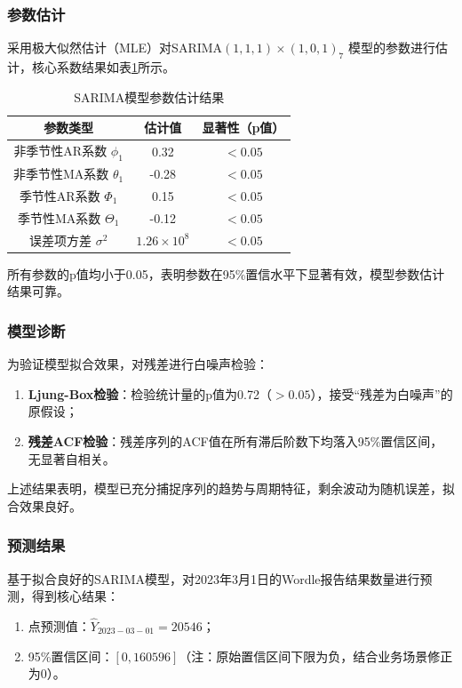 \documentclass[12pt]{article}  %
\begin{document}
\subsubsection{参数估计}
采用极大似然估计（MLE）对SARIMA$(1,1,1)\times(1,0,1)_7$ 模型的参数进行估计，核心系数结果如表\ref{tab:sarima_params}所示。
\begin{table}[htbp]
    \centering
    \caption{SARIMA模型参数估计结果}
    \label{tab:sarima_params}
    \begin{tabular}{@{}ccc@{}}
        \toprule
        参数类型 & 估计值 & 显著性（p值） \\
        \midrule
        非季节性AR系数 $\phi_1$ & 0.32 & $<0.05$ \\
        非季节性MA系数 $\theta_1$ & -0.28 & $<0.05$ \\
        季节性AR系数 $\Phi_1$ & 0.15 & $<0.05$ \\
        季节性MA系数 $\Theta_1$ & -0.12 & $<0.05$ \\
        误差项方差 $\sigma^2$ & $1.26\times10^8$ & $<0.05$ \\
        \bottomrule
    \end{tabular}
\end{table}
所有参数的p值均小于0.05，表明参数在95\%置信水平下显著有效，模型参数估计结果可靠。

\subsubsection{模型诊断}
为验证模型拟合效果，对残差进行白噪声检验：
\begin{enumerate}
    \item \textbf{Ljung-Box检验}：检验统计量的p值为0.72（$>0.05$），接受“残差为白噪声”的原假设；
    \item \textbf{残差ACF检验}：残差序列的ACF值在所有滞后阶数下均落入95\%置信区间，无显著自相关。
\end{enumerate}
上述结果表明，模型已充分捕捉序列的趋势与周期特征，剩余波动为随机误差，拟合效果良好。

\subsubsection{预测结果}
基于拟合良好的SARIMA模型，对2023年3月1日的Wordle报告结果数量进行预测，得到核心结果：
\begin{enumerate}
    \item 点预测值：$\hat{Y}_{2023-03-01}=20546$；
    \item 95\%置信区间：$[0, 160596]$（注：原始置信区间下限为负，结合业务场景修正为0）。
\end{enumerate}
\end{document}
